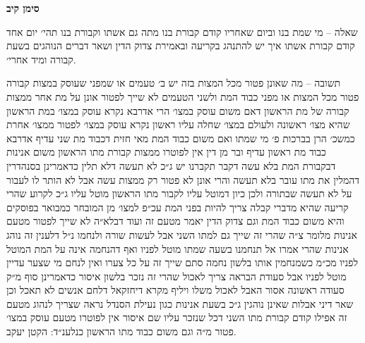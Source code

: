 \documentclass[12pt, openany]{book}
\newcommand{\chapname}{}
\newcommand{\newchap}[1]{
	\addcontentsline{toc}{chapter}{#1}
	\renewcommand{\chapname}{#1}
		\begin{center}
			\textbf{%
\fontsize{16pt}{16pt}\selectfont
				#1}
		\end{center}
}
\begin{document}
\begin{multicols}{2}
\end{multicols}\newpage

\newchap{סימן קיב}
\begin{multicols}{2}
שאלה – מי שמת בנו וביום שאחריו קודם קבורת בנו מתה גם אשתו וקבורת בנו תהי׳ יום אחד קודם קבורת אשתו איך יש להתנהג בקריעה ובאמירת צדוק הדין ושאר דברים הנוהגים בשעת קבורה ומיד אחרי׳.\\\vspace{0pt}

תשובה – מה שאונן פטור מכל המצות בזה יש ב׳ טעמים או שמפני שעוסק במצות קבורה פטור מכל המצות או מפני כבוד המת ולשני הטעמים לא שייך לפטור אונן על מת אחר ממצות קבורה של מת הראשון דאם משום עוסק במצו׳ הרי אדרבא נקרא עוסק במצו׳ במת הראשון שהיא מצו׳ ראשונה ולעולם במצו׳ שחלה עליו ראשון נקרא עוסק במצו׳ לפטור ממצו׳ אחרת כמשכ׳ הרן בברכות פ׳ מי שמתו ואם משום כבוד המת מאי חזית דכבוד מת שני עדיף אדרבא כבוד מת ראשון עדיף ובר מן דין אין לפוטרו ממצות קבורת מתו הראשון משום אנינות דבקבורת המת בלא עשה דקבר תקברנו יש ג״כ לא תעשה דלא תלין כדאמרינן בסנהדרין דהמלין את מתו עובר בלא תעשה והרי אונן לא פטור רק ממצות עשה אבל לא הותר לו לעבור על לא תעשה שבתורה ולכן כיון דמוטל עליו לקבור מתו הראשון מוטל עליו ג״כ לקרוע שהרי קריעה שהיא מדברי קבלה צריך להיות בפני המת עכ״פ למצו׳ מן המובחר כמבואר בפוסקים והיא משום כבוד המת וגם צדוק הדין יאמר מטעם זה ועוד דבלא״ה לא שייך לפטור מטעם אנינות מלומר צ״ה שהרי זה שייך גם למתו השני אבל לעשות שורה ולנחמו נ״ל דלענין זה נוהג אנינות שהרי אמרו אל תנחמנו בשעה שמתו מוטל לפניו ואף דהנחמה אינה על המת המוטל לפניו מכ״מ כשמנחמין אותו בלשון נחמה סתם שייך זה על כל צערו ואין לנחם מי שצער עדיין מוטל לפניו אבל סעודת הבראה צריך לאכול שהרי זה נזכר בלשון איסור כדאמרינן סוף מ״ק סעודה ראשונה אסור האבל לאכול משלו ויליף מקרא דיחזקאל דלחם אנשים לא תאכל וכן שאר דיני אבלות שאינן נוהגין ג״כ בשעת אנינות כגון נעילת הסנדל נראה שצריך לנהוג מטעם זה אפילו קודם קבורת מתו השני דכל שנזכר עליו שם איסור אין לפוטרו מטעם עוסק במצו׳ פטור מ״ה וגם משום כבוד מתו הראשון כנלענ״ד: הקטן יעקב.\\\vspace{0pt}

\end{multicols}\newpage
\end{document}
